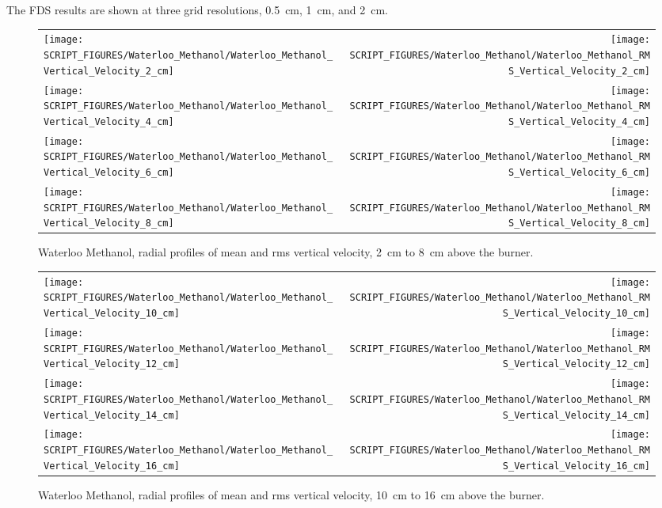 The FDS results are shown at three grid resolutions, 0.5~cm, 1~cm, and 2~cm.



\begin{figure}[p]
\begin{tabular*}{\textwidth}{l@{\extracolsep{\fill}}r}
\texttt{[image: SCRIPT\_FIGURES/Waterloo\_Methanol/Waterloo\_Methanol\_Vertical\_Velocity\_2\_cm]} &
\texttt{[image: SCRIPT\_FIGURES/Waterloo\_Methanol/Waterloo\_Methanol\_RMS\_Vertical\_Velocity\_2\_cm]} \\
\texttt{[image: SCRIPT\_FIGURES/Waterloo\_Methanol/Waterloo\_Methanol\_Vertical\_Velocity\_4\_cm]} &
\texttt{[image: SCRIPT\_FIGURES/Waterloo\_Methanol/Waterloo\_Methanol\_RMS\_Vertical\_Velocity\_4\_cm]} \\
\texttt{[image: SCRIPT\_FIGURES/Waterloo\_Methanol/Waterloo\_Methanol\_Vertical\_Velocity\_6\_cm]} &
\texttt{[image: SCRIPT\_FIGURES/Waterloo\_Methanol/Waterloo\_Methanol\_RMS\_Vertical\_Velocity\_6\_cm]} \\
\texttt{[image: SCRIPT\_FIGURES/Waterloo\_Methanol/Waterloo\_Methanol\_Vertical\_Velocity\_8\_cm]} &
\texttt{[image: SCRIPT\_FIGURES/Waterloo\_Methanol/Waterloo\_Methanol\_RMS\_Vertical\_Velocity\_8\_cm]}
\end{tabular*}
\caption[Waterloo Methanol, radial mean and rms vert.~vel., 2~cm to 8~cm above burner]
{Waterloo Methanol, radial profiles of mean and rms vertical velocity, 2~cm to 8~cm above the burner.}
\label{Water_Methanol_Vert_Vel_1}
\end{figure}

\begin{figure}[p]
\begin{tabular*}{\textwidth}{l@{\extracolsep{\fill}}r}
\texttt{[image: SCRIPT\_FIGURES/Waterloo\_Methanol/Waterloo\_Methanol\_Vertical\_Velocity\_10\_cm]} &
\texttt{[image: SCRIPT\_FIGURES/Waterloo\_Methanol/Waterloo\_Methanol\_RMS\_Vertical\_Velocity\_10\_cm]} \\
\texttt{[image: SCRIPT\_FIGURES/Waterloo\_Methanol/Waterloo\_Methanol\_Vertical\_Velocity\_12\_cm]} &
\texttt{[image: SCRIPT\_FIGURES/Waterloo\_Methanol/Waterloo\_Methanol\_RMS\_Vertical\_Velocity\_12\_cm]} \\
\texttt{[image: SCRIPT\_FIGURES/Waterloo\_Methanol/Waterloo\_Methanol\_Vertical\_Velocity\_14\_cm]} &
\texttt{[image: SCRIPT\_FIGURES/Waterloo\_Methanol/Waterloo\_Methanol\_RMS\_Vertical\_Velocity\_14\_cm]} \\
\texttt{[image: SCRIPT\_FIGURES/Waterloo\_Methanol/Waterloo\_Methanol\_Vertical\_Velocity\_16\_cm]} &
\texttt{[image: SCRIPT\_FIGURES/Waterloo\_Methanol/Waterloo\_Methanol\_RMS\_Vertical\_Velocity\_16\_cm]}
\end{tabular*}
\caption[Waterloo Methanol, radial mean and rms vert.~vel., 10~cm to 16~cm above burner]
{Waterloo Methanol, radial profiles of mean and rms vertical velocity, 10~cm to 16~cm above the burner.}
\label{Water_Methanol_Vert_Vel_2}
\end{figure}

